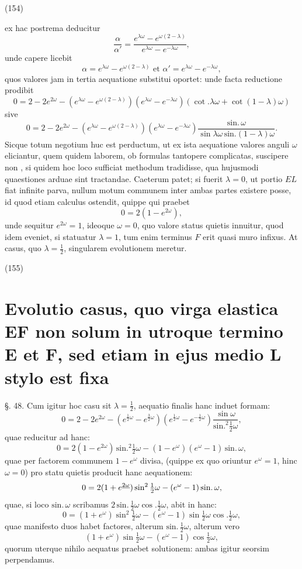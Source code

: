 \documentclass[11pt,a4paper]{article}
\begin{document}
(154)

ex hac postrema deducitur
\[ \frac{\alpha}{\alpha'}=\frac{e^{\lambda\omega}-e^{\omega(2-\lambda)}}{e^{\lambda\omega}-e^{-\lambda\omega}}, \]
unde capere licebit
\[ \alpha=e^{\lambda\omega}-e^{\omega(2-\lambda)} \text{ et } \alpha'=e^{\lambda\omega}-e^{-\lambda\omega}, \]
quos valores jam in tertia aequatione substitui oportet: unde facta
reductione prodibit
\[ 0=2-2e^{2\omega}-(e^{\lambda\omega}-e^{\omega(2-\lambda)})(e^{\lambda\omega}-e^{-\lambda\omega})(\cot.\lambda\omega+\cot(1-\lambda)\omega) \]
sive
\[ 0=2-2e^{2\omega}-(e^{\lambda\omega}-e^{\omega(2-\lambda)})(e^{\lambda\omega}-e^{-\lambda\omega})\frac{\text{sin.}\,\omega}{\sin\lambda\omega\,\text{sin.}(1-\lambda)\omega}. \]
Sicque totum negotium huc est perductum, ut ex ista aequatione
valores anguli $\omega$ eliciantur, quem quidem laborem, ob formulas
tantopere complicatas, suscipere non , si quidem hoc loco
sufficiat methodum tradidisse, qua hujusmodi quaestiones arduae
sint tractandae. Caeterum patet; si fuerit $\lambda=0$, ut portio
$EL$ fiat infinite parva, nullum motum communem inter ambas
partes existere posse, id quod etiam calculus ostendit, quippe
qui praebet
\[ 0=2(1-e^{2\omega}), \]
unde sequitur $e^{2\omega}=1$, ideoque $\omega=0$, quo valore status
quietis innuitur, quod idem eveniet, si statuatur $\lambda=1$, tum
enim terminus $F$ erit quasi muro infixus. At casus, quo
$\lambda=\frac{1}{2}$, singularem evolutionem meretur.

(155)

\section{Evolutio casus, quo virga elastica EF non solum in utroque termino E et F, sed etiam in ejus medio L stylo est fixa}

§. 48. Cum igitur hoc casu sit $\lambda=\frac{1}{2}$, aequatio finalis hanc induet
formam:
\[ 0=2-2e^{2\omega}-(e^{\frac{1}{2}\omega}-e^{\frac{3}{2}\omega})(e^{\frac{1}{2}\omega}-e^{-\frac{1}{2}\omega})\frac{\sin\omega}{\text{sin.}^2\frac{1}{2}\omega}, \]
quae reducitur ad hanc:
\[ 0=2(1-e^{2\omega})\,\text{sin.}^2\tfrac{1}{2}\omega-(1-e^{\omega})(e^{\omega}-1)\,\text{sin.}\,\omega, \]
quae per factorem communem $1-e^{\omega}$ divisa, (quippe ex quo oriuntur
$e^{\omega}=1$, hinc $\omega=0$) pro statu quietis producit hanc aequationem:
\[ 0=2(1+e^{\uncertain{2\omega}})\sin^2\tfrac{1}{2}\omega-(e^{\omega}-1)\,\text{sin.}\,\omega, \]
quae, si loco $\text{sin.}\,\omega$ scribamus $2\,\text{sin.}\,\frac{1}{2}\omega\cos.\frac{1}{2}\omega$, abit in hanc:
\[ 0=(1+e^{\omega})\sin^2\tfrac{1}{2}\omega-(e^{\omega}-1)\sin\tfrac{1}{2}\omega\cos.\tfrac{1}{2}\omega, \]
quae manifesto duos habet factores, alterum $\text{sin.}\,\frac{1}{2}\omega$, alterum vero
\[ (1+e^{\omega})\sin\tfrac{1}{2}\omega-(e^{\omega}-1)\cos\tfrac{1}{2}\omega, \]
quorum uterque nihilo aequatus praebet solutionem: ambas
igitur seorsim perpendamus.
\end{document}
